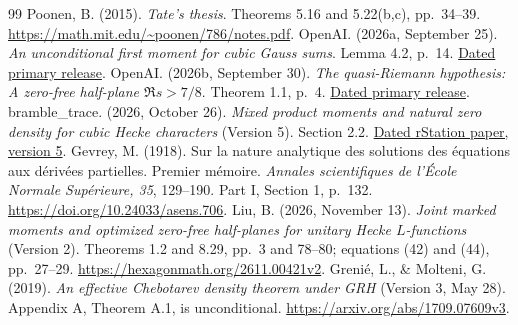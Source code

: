 \documentclass[11pt]{article}
\begin{document}
\begin{thebibliography}{99}
 Poonen, B. (2015).
\emph{Tate's thesis}. Theorems 5.16 and 5.22(b,c), pp.~34--39.
\url{https://math.mit.edu/~poonen/786/notes.pdf}.
 OpenAI. (2026a, September 25).
\emph{An unconditional first moment for cubic Gauss sums}.
Lemma 4.2, p.~14.
\href{https://github.com/openai/math/blob/main/preprints/An-unconditional-first-moment-for-cubic-Gauss-sums-September-25-2026/paper.pdf}{Dated primary release}.
 OpenAI. (2026b, September 30).
\emph{The quasi-Riemann hypothesis: A zero-free half-plane
$\Re s>7/8$}. Theorem 1.1, p.~4.
\href{https://github.com/openai/math/blob/main/preprints/The-Quasi-Riemann-Hypothesis-September-30-2026/paper.pdf}{Dated primary release}.
 bramble\_trace. (2026, October 26).
\emph{Mixed product moments and natural zero density for cubic
Hecke characters} (Version 5). Section 2.2.
\href{https://rstation.ai/problems/riemann_hypothesis/papers/52}{Dated rStation paper, version 5}.
 Gevrey, M. (1918). Sur la nature analytique des solutions des \'equations aux d\'eriv\'ees partielles. Premier m\'emoire. \emph{Annales scientifiques de l'\'Ecole Normale Sup\'erieure, 35}, 129--190. Part I, Section 1, p.~132. \url{https://doi.org/10.24033/asens.706}.
 Liu, B. (2026, November 13).
\emph{Joint marked moments and optimized zero-free half-planes
for unitary Hecke $L$-functions} (Version 2).
Theorems 1.2 and 8.29, pp.~3 and 78--80; equations (42) and (44), pp.~27--29.
\url{https://hexagonmath.org/2611.00421v2}.
 Greni\'e, L., \& Molteni, G. (2019).
\emph{An effective Chebotarev density theorem under GRH}
(Version 3, May 28). Appendix A, Theorem A.1, is unconditional.
\url{https://arxiv.org/abs/1709.07609v3}.
\end{thebibliography}
\end{document}
